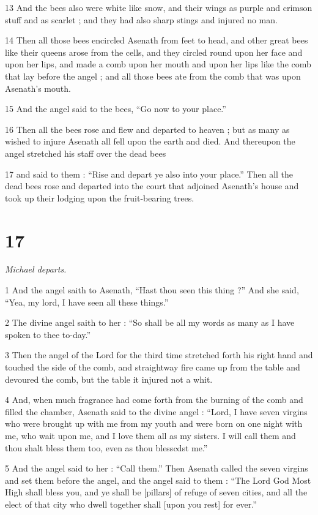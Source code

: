 13 And the bees also were white like snow, and their wings as purple and crimson stuff and as scarlet ; and they had also sharp stings and injured no man. 

14 Then all those bees encircled Asenath from feet to head, and other great bees like their queens arose from the cells, and they circled round upon her face and upon her lips, and made a comb upon her mouth and upon her lips like the comb that lay before the angel ; and all those bees ate from the comb that was upon Asenath's mouth. 

15 And the angel said to the bees, “Go now to your place.” 

16 Then all the bees rose and flew and departed to heaven ; but as many as wished to injure Asenath all fell upon the earth and died. And thereupon the angel stretched his staff over the dead bees 

17 and said to them : “Rise and depart ye also into your place.” Then all the dead bees rose and departed into the court that adjoined Asenath's house and took up their lodging upon the fruit-bearing trees. 

\chapter{17}

\par \textit{Michael departs.}

1 And the angel saith to Asenath, “Hast thou seen this thing ?” And she said, “Yea, my lord, I have seen all these things.” 

2 The divine angel saith to her : “So shall be all my words as many as I have spoken to thee to-day.” 

3 Then the angel of the Lord for the third time stretched forth his right hand and touched the side of the comb, and straightway fire came up from the table and devoured the comb, but the table it injured not a whit. 

4 And, when much fragrance had come forth from the burning of the comb and filled the chamber, Asenath said to the divine angel : “Lord, I have seven virgins who were brought up with me from my youth and were born on one night with me, who wait upon me, and I love them all as my sisters. I will call them and thou shalt bless them too, even as thou blesscdst me.” 

5 And the angel said to her : “Call them.” Then Asenath called the seven virgins and set them before the angel, and the angel said to them : “The Lord God Most High shall bless you, and ye shall be [pillars] of refuge of seven cities, and all the elect of that city who dwell together shall [upon you rest] for ever.” 


